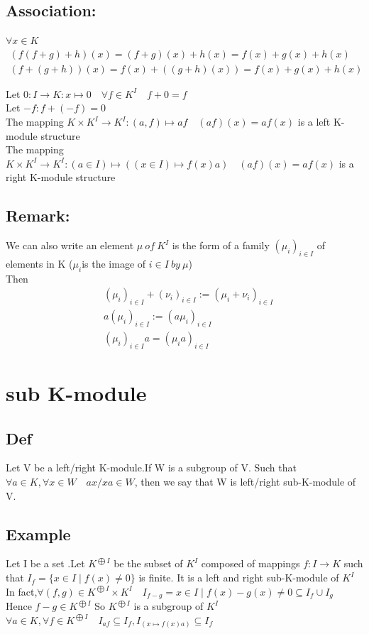 \documentclass{book}
\begin{document}
\subsection{Association:}
$\forall x\in K$
\begin{align*}
    (f(f+g)+h)(x)=(f+g)(x)+h(x)=f(x)+g(x)+h(x)\\
    (f+(g+h))(x)=f(x)+((g+h)(x))=f(x)+g(x)+h(x)
\end{align*} 

Let $0:I\rightarrow K:x\mapsto0 \quad \forall f\in K^I\quad f+0=f$\\
Let $-f: f+(-f)=0$\\
The mapping $K\times K^I\rightarrow K^I:(a,f)\mapsto af\quad (af)(x)=af(x)$ is a left K-module structure\\
The mapping $K\times K^I\rightarrow K^I:(a\in I)\mapsto ((x\in I)\mapsto f(x)a)\quad (af)(x)=af(x)$ is a right K-module structure
\subsection{Remark:}

We can also write an element $\mu\ of\ K^I$ is the form of a family $(\mu_i)_{i\in I}$ of elements in K ($\mu_i$is the image of $i\in I\ by\ \mu$)\\
Then \begin{align*}
    &(\mu_i)_{i\in I}+(\nu_i)_{i\in I}:=(\mu_i+\nu_i)_{i\in I}\\
    &a(\mu_i)_{i\in I}:=(a\mu_i)_{i\in I}\\
    &(\mu_i)_{i\in I}a=(\mu_ia)_{i\in I}
\end{align*}
\section{sub K-module}
\subsection{Def}

Let V be a left/right K-module.If W is a subgroup of V. Such that $\forall a\in K,\forall x\in W\quad ax/xa\in W$, then we say that W is left/right sub-K-module of V.
\subsection{Example}

Let I be a set .Let $K^{\bigoplus I}$ be the subset of $K^I$ composed of mappings $f:I\rightarrow K$ such that $I_f=\{x\in I\mid f(x)\not=0\}$ is finite. It is a left and right sub-K-module of $K^I$\\
\indent In fact,$\forall (f,g)\in K^{\bigoplus I}\times K^I\quad I_{f-g}={x\in I\mid f(x)-g(x)\not=0}\subseteq I_f\cup I_g$\\
\indent Hence $f-g\in K^{\bigoplus I}$ So $K^{\bigoplus I}$ is a subgroup of $K^I$\\
\indent $\forall a\in K,\forall f\in K^{\bigoplus I}\quad I_{af}\subseteq I_f,I_{(x\mapsto f(x)a)}\subseteq I_f$
\end{document}
